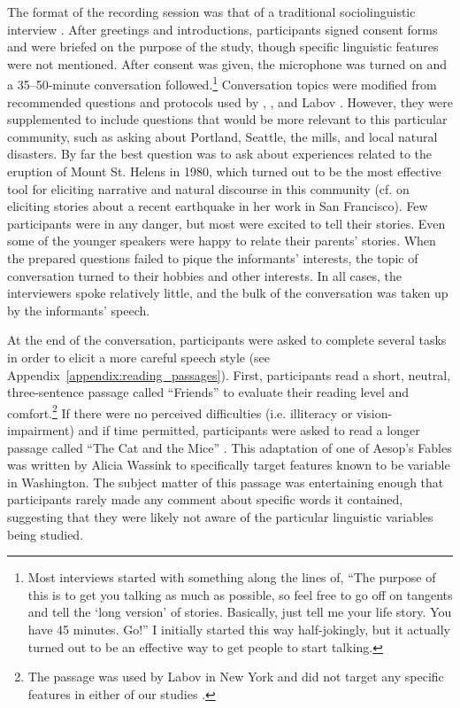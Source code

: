 The format of the recording session was that of a traditional sociolinguistic interview \citep{labov_1984}. After greetings and introductions, participants signed consent forms and were briefed on the purpose of the study, though specific linguistic features were not mentioned. After consent was given, the microphone was turned on and a 35--50-minute conversation followed.\footnote{Most interviews started with something along the lines of, ``The purpose of this is to get you talking as much as possible, so feel free to go off on tangents and tell the `long version' of stories. Basically, just tell me your life story. You have 45 minutes. Go!'' I initially started this way half-jokingly, but it actually turned out to be an effective way to get people to start talking.} Conversation topics were modified from recommended questions and protocols used by \citet{wolfram_1974}, \citet{tagliamonte_2006}, and Labov \citep{labov_1998_2004, labov_1984}. However, they were supplemented to include questions that would be more relevant to this particular community, such as asking about Portland, Seattle, the mills, and local natural disasters. By far the best question was to ask about experiences related to the eruption of Mount St. Helens in 1980, which turned out to be the most effective tool for eliciting narrative and natural discourse in this community (cf. \citealt[92]{moonwomon_1991_diss} on eliciting stories about a recent earthquake in her work in San Francisco). Few participants were in any danger, but most were excited to tell their stories. Even some of the younger speakers were happy to relate their parents' stories. When the prepared questions failed to pique the informants' interests, the topic of conversation turned to their hobbies and other interests. In all cases, the interviewers spoke relatively little, and the bulk of the conversation was taken up by the informants' speech.

At the end of the conversation, participants were asked to complete several tasks in order to elicit a more careful speech style (see Appendix~\ref{appendix:reading_passages}). First, participants read a short, neutral, three-sentence passage called ``Friends'' to evaluate their reading level and comfort.\footnote{The passage was used by Labov in New York and did not target any specific features in either of our studies \citep[417]{labov_2006}.} If there were no perceived difficulties (i.e. illiteracy or vision-impairment) and if time permitted, participants were asked to read a longer passage called ``The Cat and the Mice'' \citep{freeman_2014}. This adaptation of one of Aesop's Fables was written by Alicia Wassink to specifically target features known to be variable in Washington. The subject matter of this passage was entertaining enough that participants rarely made any comment about specific words it contained, suggesting that they were likely not aware of the particular linguistic variables being studied.

